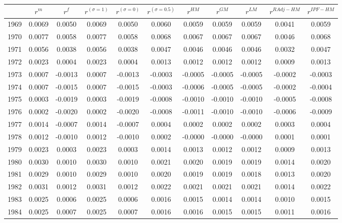 \begin{tabular}{ccccccccccc}
  \hline
 & $r^m$ & $r^f$ & $r^{(\sigma = 1)}$ & $r^{(\sigma = 0)}$ & $r^{(\sigma = 0.5)}$ & $r^{HM}$ & $r^{GM}$ & $r^{LM}$ & $r^{RAdj-HM}$ & $r^{IPF-HM}$ \\ 
  \hline
1969 & 0.0069 & 0.0050 & 0.0069 & 0.0050 & 0.0060 & 0.0059 & 0.0059 & 0.0059 & 0.0041 & 0.0059 \\ 
  1970 & 0.0077 & 0.0058 & 0.0077 & 0.0058 & 0.0068 & 0.0067 & 0.0067 & 0.0067 & 0.0046 & 0.0068 \\ 
  1971 & 0.0056 & 0.0038 & 0.0056 & 0.0038 & 0.0047 & 0.0046 & 0.0046 & 0.0046 & 0.0032 & 0.0047 \\ 
  1972 & 0.0023 & 0.0004 & 0.0023 & 0.0004 & 0.0013 & 0.0012 & 0.0012 & 0.0012 & 0.0009 & 0.0013 \\ 
  1973 & 0.0007 & -0.0013 & 0.0007 & -0.0013 & -0.0003 & -0.0005 & -0.0005 & -0.0005 & -0.0002 & -0.0003 \\ 
  1974 & 0.0007 & -0.0015 & 0.0007 & -0.0015 & -0.0003 & -0.0006 & -0.0005 & -0.0005 & -0.0002 & -0.0004 \\ 
  1975 & 0.0003 & -0.0019 & 0.0003 & -0.0019 & -0.0008 & -0.0010 & -0.0010 & -0.0010 & -0.0005 & -0.0008 \\ 
  1976 & 0.0002 & -0.0020 & 0.0002 & -0.0020 & -0.0008 & -0.0011 & -0.0010 & -0.0010 & -0.0006 & -0.0009 \\ 
  1977 & 0.0014 & -0.0007 & 0.0014 & -0.0007 & 0.0004 & 0.0002 & 0.0002 & 0.0002 & 0.0003 & 0.0004 \\ 
  1978 & 0.0012 & -0.0010 & 0.0012 & -0.0010 & 0.0002 & -0.0000 & -0.0000 & -0.0000 & 0.0001 & 0.0001 \\ 
  1979 & 0.0023 & 0.0003 & 0.0023 & 0.0003 & 0.0014 & 0.0013 & 0.0012 & 0.0012 & 0.0009 & 0.0013 \\ 
  1980 & 0.0030 & 0.0010 & 0.0030 & 0.0010 & 0.0021 & 0.0020 & 0.0019 & 0.0019 & 0.0014 & 0.0020 \\ 
  1981 & 0.0029 & 0.0010 & 0.0029 & 0.0010 & 0.0020 & 0.0019 & 0.0019 & 0.0018 & 0.0013 & 0.0020 \\ 
  1982 & 0.0031 & 0.0012 & 0.0031 & 0.0012 & 0.0022 & 0.0021 & 0.0021 & 0.0021 & 0.0014 & 0.0022 \\ 
  1983 & 0.0025 & 0.0006 & 0.0025 & 0.0006 & 0.0016 & 0.0015 & 0.0014 & 0.0014 & 0.0010 & 0.0015 \\ 
  1984 & 0.0025 & 0.0007 & 0.0025 & 0.0007 & 0.0016 & 0.0016 & 0.0015 & 0.0015 & 0.0011 & 0.0016 \\ 

\end{tabular}
